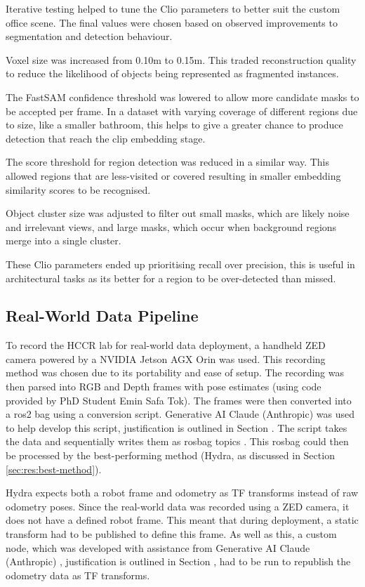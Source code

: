 Iterative testing helped to tune the Clio parameters to better suit the custom office scene. The final values were chosen based on observed improvements to segmentation and detection behaviour.

Voxel size was increased from 0.10m to 0.15m. This traded reconstruction quality to reduce the likelihood of objects being represented as fragmented instances. 

The FastSAM confidence threshold was lowered to allow more candidate masks to be accepted per frame. In a dataset with varying coverage of different regions due to size, like a smaller bathroom, this helps to give a greater chance to produce detection that reach the \acrshort{clip} embedding stage.

The score threshold for region detection was reduced in a similar way. This allowed regions that are less-visited or covered resulting in smaller embedding similarity scores to be recognised.

Object cluster size was adjusted to filter out small masks, which are likely noise and irrelevant views, and large masks, which occur when background regions merge into a single cluster.

These Clio parameters ended up prioritising recall over precision, this is useful in architectural tasks as its better for a region to be over-detected than missed.


\subsection{Real-World Data Pipeline}\label{sec:real-data-pipeline}

To record the HCCR lab for real-world data deployment, a handheld ZED camera powered by a NVIDIA Jetson AGX Orin was used. This recording method was chosen due to its portability and ease of setup. The recording was then parsed into RGB and Depth frames with pose estimates (using code provided by PhD Student Emin Safa Tok). The frames were then converted into a ros2 bag using a conversion script. Generative AI Claude (Anthropic) \cite{Claude2024} was used to help develop this script, justification is outlined in Section \pageref{ai-use}. The script takes the data and sequentially writes them as rosbag topics . This rosbag could then be processed by the best-performing method (Hydra, as discussed in Section \ref{sec:res:best-method}).

Hydra expects both a robot frame and odometry as TF transforms instead of raw odometry poses. Since the real-world data was recorded using a ZED camera, it does not have a defined robot frame. This meant that during deployment, a static transform had to be published to define this frame. As well as this, a custom node, which was developed with assistance from Generative AI Claude (Anthropic) \cite{Claude2024}, justification is outlined in Section \pageref{ai-use}, had to be run to republish the odometry data as TF transforms.

